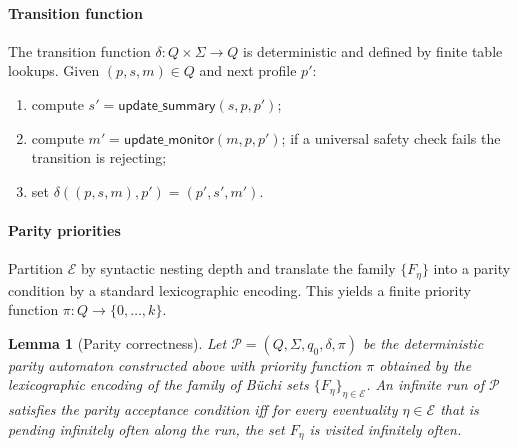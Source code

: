\documentclass[11pt]{article}
\newtheorem{lemma}[theorem]{Lemma}
\begin{document}
\paragraph{Transition function}
The transition function $\delta:Q\times\Sigma\to Q$ is deterministic and
defined by finite table lookups. Given $(p,s,m)\in Q$ and next profile $p'$:
\begin{enumerate}
  \item compute $s'=\mathsf{update\_summary}(s,p,p')$;
  \item compute $m'=\mathsf{update\_monitor}(m,p,p')$; if a universal safety
    check fails the transition is rejecting;
  \item set $\delta((p,s,m),p')=(p',s',m')$.
\end{enumerate}

\paragraph{Parity priorities}
Partition $\mathcal{E}$ by syntactic nesting depth and translate the family
$\{F_\eta\}$ into a parity condition by a standard lexicographic encoding.
This yields a finite priority function $\pi:Q\to\{0,\dots,k\}$.

\begin{lemma}[Parity correctness]
\label{lem:parity-correct}
Let $\mathcal{P}=(Q,\Sigma,q_0,\delta,\pi)$ be the deterministic parity
automaton constructed above with priority function $\pi$ obtained by the
lexicographic encoding of the family of Büchi sets $\{F_\eta\}_{\eta\in\mathcal{E}}$.
An infinite run of $\mathcal{P}$ satisfies the parity acceptance condition
iff for every eventuality $\eta\in\mathcal{E}$ that is pending infinitely
often along the run, the set $F_\eta$ is visited infinitely often.
\end{lemma}
\end{document}
